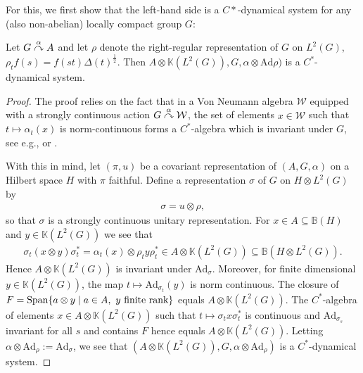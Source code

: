 For this, we first show that the left-hand side is a $C*$-dynamical system for any (also non-abelian) locally compact group $G$:
\begin{proposition}
	Let $G \stackrel{\alpha}{\curvearrowright} A$ and let $\rho$ denote the right-regular representation of $G$ on $L^2(G)$, $\rho_t f(s) = f(st) \Delta(t)^{\frac12}$. Then $A \otimes \mathbb{K}(L^2(G)), G, \alpha \otimes \mathrm{Ad} \rho)$ is a $C^*$-dynamical system.
\end{proposition}
\begin{proof}
	The proof relies on the fact that  in a Von Neumann algebra $\mathcal{W}$ equipped with a strongly continuous action $G \stackrel{\alpha}{\curvearrowright} \mathcal{W}$, the set of elements $x \in \mathcal{W}$ such that $t \mapsto \alpha_t(x)$ is norm-continuous forms a $C^*$-algebra which is invariant under $G$, see e.g., \cite[Lemma 7.5.1]{pedersenalgauto} or \cite[Proposition III.3.2.4]{blackadar}.
	
	With this in mind, let $(\pi,u)$ be a covariant representation of $(A, G, \alpha)$ on a Hilbert space $H$ with $\pi$ faithful. Define a representation $\sigma$ of $G$ on $H \otimes L^2(G)$ by
	\begin{align*}
	\sigma = u \otimes \rho,
	\end{align*}
	so that $\sigma$ is a strongly continuous unitary representation. For $x \in A \subseteq \mathbb{B}(H)$ and $y \in \mathbb{K}(L^2(G))$ we see that
	\begin{align*}
		\sigma_t (x \otimes y) \sigma_t^* = \alpha_t(x) \otimes \rho_t y \rho_t^* \in A \otimes \mathbb{K}(L^2(G)) \subseteq \mathbb{B}(H \otimes L^2(G)).
	\end{align*}
	Hence $A \otimes \mathbb{K}(L^2(G))$ is invariant under $\mathrm{Ad}_\sigma$. Moreover, for finite dimensional $y \in \mathbb{K}(L^2(G))$, the map $t \mapsto \mathrm{Ad}_{\sigma_t}(y)$ is norm continuous. The closure of $F = \mathrm{Span}\{a \otimes y \mid a \in A, \ y \text{ finite rank}\}$ equals $A \otimes \mathbb{K}(L^2(G))$. The $C^*$-algebra of elements $x \in A \otimes \mathbb{K}(L^2(G))$ such that $t \mapsto \sigma_t x \sigma_t^*$ is continuous and $\mathrm{Ad}_{\sigma_s}$ invariant for all $s$ and contains $F$ hence equals $A \otimes \mathbb{K}(L^2(G))$. Letting $\alpha \otimes \mathrm{Ad}_\rho := \mathrm{Ad}_{\sigma}$, we see that $(A \otimes \mathbb{K}(L^2(G)), G , \alpha \otimes \mathrm{Ad}_\rho)$ is a $C^*$-dynamical system.
\end{proof}


